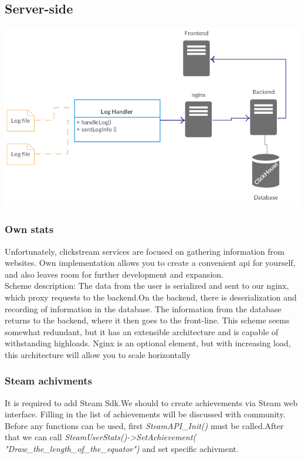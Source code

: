 \documentclass[]{article}
\begin{document}
\subsection{Server-side}
\includegraphics[scale=0.8]{scheme}
\subsubsection{Own stats}
Unfortunately, clickstream services are focused on gathering information from websites. Own implementation allows you to create a convenient api for yourself, and also leaves room for further development and expansion.\\
Scheme description:
The data from the user is serialized and sent to our nginx, which proxy requests to the backend.On the backend, there is deserialization and recording of information in the database.  The information from the database returns to the backend, where it then goes to the front-line. This scheme seems somewhat redundant, but it has an extensible architecture and is capable of withstanding highloads. Nginx is  an optional element, but with increasing load, this architecture will allow you to scale horizontally
\subsubsection{Steam achivments}
It is required to add Steam Sdk.We should to create achievements via Steam web interface. Filling in the list of achievements will be discussed with community. Before any functions can be used, first  {\itshape SteamAPI\_Init()} must be called.After that we can call \textit{SteamUserStats()->SetAchievement( "Draw\_the\_length\_of\_the\_equator") }and set specific achivment.
\end{document}
